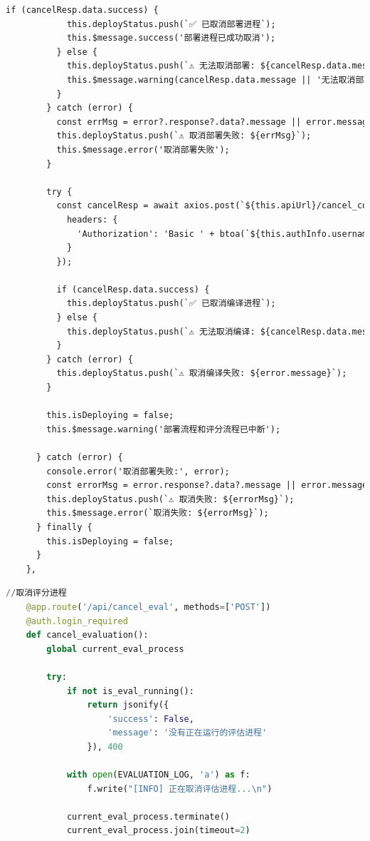 \documentclass[AutoFakeBold,AutoFakeSlant,language=chinese,degree=bachelor]{sustechthesis}
\begin{document}
\begin{itemize}
\begin{lstlisting}[language=HTML]
          if (cancelResp.data.success) {
            this.deployStatus.push(`✅ 已取消部署进程`);
            this.$message.success('部署进程已成功取消');
          } else {
            this.deployStatus.push(`⚠️ 无法取消部署: ${cancelResp.data.message}`);
            this.$message.warning(cancelResp.data.message || '无法取消部署进程');
          }
        } catch (error) {
          const errMsg = error?.response?.data?.message || error.message;
          this.deployStatus.push(`⚠️ 取消部署失败: ${errMsg}`);
          this.$message.error('取消部署失败');
        }

        try {
          const cancelResp = await axios.post(`${this.apiUrl}/cancel_compile`, {}, {
            headers: {
              'Authorization': 'Basic ' + btoa(`${this.authInfo.username}:${this.authInfo.password}`)
            }
          });

          if (cancelResp.data.success) {
            this.deployStatus.push(`✅ 已取消编译进程`);
          } else {
            this.deployStatus.push(`⚠️ 无法取消编译: ${cancelResp.data.message}`);
          }
        } catch (error) {
          this.deployStatus.push(`⚠️ 取消编译失败: ${error.message}`);
        }

        this.isDeploying = false;
        this.$message.warning('部署流程和评分流程已中断');

      } catch (error) {
        console.error('取消部署失败:', error);
        const errorMsg = error.response?.data?.message || error.message;
        this.deployStatus.push(`⚠️ 取消失败: ${errorMsg}`);
        this.$message.error(`取消失败: ${errorMsg}`);
      } finally {
        this.isDeploying = false;
      }
    },
    \end{lstlisting}
    \begin{lstlisting}[language=python]
    //取消评分进程
    @app.route('/api/cancel_eval', methods=['POST'])
    @auth.login_required
    def cancel_evaluation():
        global current_eval_process
        
        try:
            if not is_eval_running():
                return jsonify({
                    'success': False,
                    'message': '没有正在运行的评估进程'
                }), 400
            
            with open(EVALUATION_LOG, 'a') as f:
                f.write("[INFO] 正在取消评估进程...\n")
            
            current_eval_process.terminate()
            current_eval_process.join(timeout=2)
            

\end{lstlisting}
\end{itemize}
\end{document}
